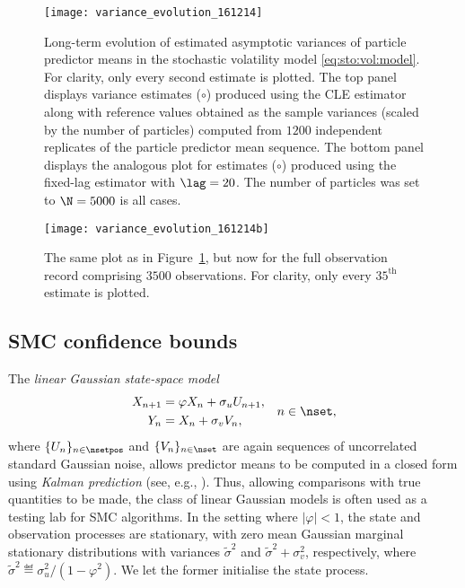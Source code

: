 \begin{figure}[H] %
\centering
\texttt{[image: variance\_evolution\_161214]}
\caption{Long-term evolution of estimated asymptotic variances of particle predictor means in the stochastic volatility model \eqref{eq:sto:vol:model}. For clarity, only every second estimate is plotted. 
The top panel displays variance estimates ($\circ$) produced using the CLE estimator along with reference values obtained as the sample variances (scaled by the number of particles) computed from $1200$ independent replicates of the particle predictor mean sequence. The bottom panel displays the analogous plot for estimates ($\circ$) produced using the fixed-lag estimator with $\lag = 20$. The number of particles was set to $\N = 5000$ is all cases.}
 \label{fig:variance:evolution:short}
\end{figure}

\begin{figure}[H] %
\centering
\texttt{[image: variance\_evolution\_161214b]}
\caption{The same plot as in Figure~\ref{fig:variance:evolution:short}, but now for the full observation record comprising $3500$ observations. For clarity, only every $35^{\mathrm{th}}$ estimate is plotted.}
\label{fig:variance:evolution:long}
\end{figure}



\subsection{SMC confidence bounds}
\label{sec:lin:Gauss:model}

The \emph{linear Gaussian state-space model}
\begin{equation} \label{eq:lin:Gauss:model}
\begin{split}
X_{n + 1} &= \varphi X_n + \sigma_u U_{n + 1}, \\
Y_n &= X_n + \sigma_v V_n,   
\end{split}
\quad n \in \nset, 
\end{equation}
where $\{ U_n \}_{n \in \nsetpos}$ and $\{ V_n \}_{n \in \nset}$ are again sequences of uncorrelated standard Gaussian noise, allows predictor means to be computed in a closed form using \emph{Kalman prediction} (see, e.g., \cite[Algorithm~5.2.9]{cappe:moulines:ryden:2005}). Thus, allowing comparisons with true quantities to be made, the class of linear Gaussian models is often used as a testing lab for SMC algorithms. In the setting where $|\varphi| < 1$, the state and observation processes are stationary, with zero mean Gaussian marginal stationary distributions with variances $\tilde{\sigma}^2$ and $\tilde{\sigma}^2 + \sigma_v^2$, respectively, where $\tilde{\sigma}^2 \eqdef \sigma_u^2 / (1 - \varphi^2)$. We let the former initialise the state process. 

